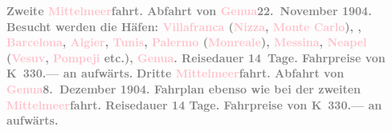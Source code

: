            \textcolor{gray}{\textbf{\textbf{Zweite \textcolor{pink}{Mittelmeer}{}\ledrightnote{\textcolor{pink}{Mittelmeer}}fahrt.}
                  Abfahrt von \textcolor{pink}{Genua}{}\ledrightnote{\textcolor{pink}{Genua}}{ }\textbf{22. November 1904}. Besucht werden die Häfen: \textcolor{pink}{Villafranca}{}\ledrightnote{\textcolor{pink}{Villefranche-sur-Mer}}
                     (\textcolor{pink}{Nizza}{}\ledrightnote{\textcolor{pink}{Nizza}}, \textcolor{pink}{Monte
                     Carlo}{}\ledrightnote{\textcolor{pink}{Monte Carlo}}), \label{T_L01495_1v}\label{T_L01495_1h}, \textcolor{pink}{Barcelona}{}\ledrightnote{\textcolor{pink}{Barcelona}}, \textcolor{pink}{Algier}{}\ledrightnote{\textcolor{pink}{Algiers}}, \textcolor{pink}{Tunis}{}\ledrightnote{\textcolor{pink}{Tunis}}, \textcolor{pink}{Palermo}{}\ledrightnote{\textcolor{pink}{Palermo}} (\textcolor{pink}{Monreale}{}\ledrightnote{\textcolor{pink}{Monreale}}), \textcolor{pink}{Messina}{}\ledrightnote{\textcolor{pink}{Messina}}, \textcolor{pink}{Neapel}{}\ledrightnote{\textcolor{pink}{Neapel}} (\textcolor{pink}{Vesuv}{}\ledrightnote{\textcolor{pink}{Vesuv}}, \textcolor{pink}{Pompeji}{}\ledrightnote{\textcolor{pink}{Pompei}} etc.), \textcolor{pink}{Genua}{}\ledrightnote{\textcolor{pink}{Genua}}. Reisedauer 14 Tage. Fahrpreise von \textbf{K 330.—} an aufwärts.}}\pend
           \pstart
           \textcolor{gray}{\textbf{\textbf{Dritte \textcolor{pink}{Mittelmeer}{}\ledrightnote{\textcolor{pink}{Mittelmeer}}fahrt.}
                  Abfahrt von \textcolor{pink}{Genua}{}\ledrightnote{\textcolor{pink}{Genua}}{ }\textbf{8. Dezember 1904}. Fahrplan ebenso wie bei der zweiten \textcolor{pink}{Mittelmeer}{}\ledrightnote{\textcolor{pink}{Mittelmeer}}fahrt. Reisedauer 14 Tage. Fahrpreise von \textbf{K 330.—} an aufwärts.}}\pend
           \pstart
